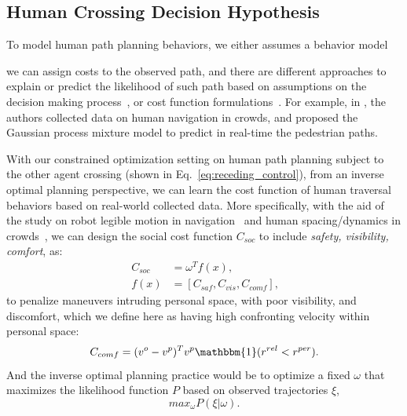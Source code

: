 \documentclass[conference]{IEEEtran}
\begin{document}
\subsection{Human Crossing Decision Hypothesis} 
To model human path planning behaviors, we either assumes a behavior model 

we can assign costs to 
the observed path, and there are different approaches to explain or predict 
the likelihood of such path based on assumptions on the decision making 
process~\cite{ratliff2006maximum, ziebart2008maximum}, or cost function 
formulations~\cite{kruse2012legible}. For example, in 
\cite{trautman2010unfreezing}, the authors collected data on human 
navigation in crowds, and proposed the Gaussian 
process mixture model to predict in real-time the pedestrian paths. 

With our constrained optimization setting on human path planning subject to the other agent 
crossing (shown in Eq.~\ref{eq:receding_control}), from an inverse optimal 
planning perspective, we can learn the cost function of human traversal 
behaviors based on real-world collected data. More specifically, with the aid 
of the study on robot legible motion in 
navigation~\cite{kruse2012legible,lichtenthaler2012influence} and human 
spacing/dynamics in crowds~\cite{helbing1995social,hall1966hidden}, we can 
design the social cost function $C_{soc}$ to include \textit{safety, 
visibility, comfort}, as:
\begin{equation}~\label{eq:social_cost}
  \begin{aligned}
    C_{soc} &= \omega^T f(x), \\
    f(x) &= [C_{saf}, C_{vis}, C_{comf}],
  \end{aligned}
\end{equation}
to penalize maneuvers intruding personal space, with poor visibility, and 
discomfort, which we define here as having high confronting velocity within personal space:
\begin{equation}
  C_{comf} = (v^o-v^p)^T v^p \mathbbm{1}(r^{rel}<r^{per}).
\end{equation}
And the inverse optimal planning practice would be to optimize a fixed 
$\omega$ that maximizes the likelihood function $P$ based on observed 
trajectories $\xi$,
\begin{equation}
  max_{\omega} P(\xi|\omega).
\end{equation}
\end{document}
